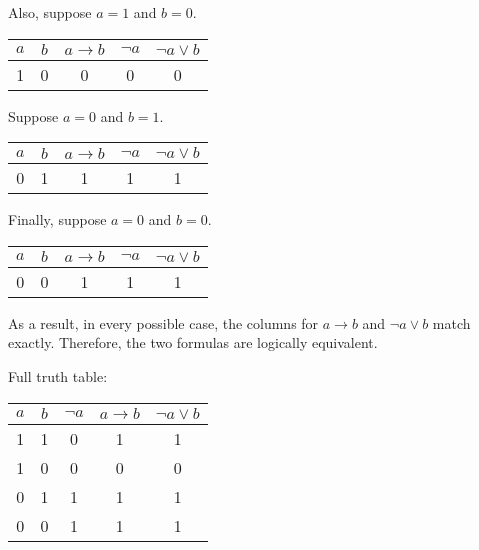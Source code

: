 \documentclass[12pt,a4paper,openany]{article}
\begin{document}
Also, suppose $a = 1$ and $b = 0$.

\begin{center}
\begin{tabular}{|c|c|c|c|c|}
\hline
$a$ & $b$ & $a \rightarrow b$ & $\neg a$ & $\neg a \lor b$ \\
\hline
\textcolor{truecolor}{1} & \textcolor{falsecolor}{0} & \textcolor{falsecolor}{0} & \textcolor{falsecolor}{0} & \textcolor{falsecolor}{0} \\
\hline
\end{tabular}
\end{center}

Suppose $a = 0$ and $b = 1$.

\begin{center}
\begin{tabular}{|c|c|c|c|c|}
\hline
$a$ & $b$ & $a \rightarrow b$ & $\neg a$ & $\neg a \lor b$ \\
\hline
\textcolor{falsecolor}{0} & \textcolor{truecolor}{1} & \textcolor{truecolor}{1} & \textcolor{truecolor}{1} & \textcolor{truecolor}{1} \\
\hline
\end{tabular}
\end{center}

Finally, suppose $a = 0$ and $b = 0$.

\begin{center}
\begin{tabular}{|c|c|c|c|c|}
\hline
$a$ & $b$ & $a \rightarrow b$ & $\neg a$ & $\neg a \lor b$ \\
\hline
\textcolor{falsecolor}{0} & \textcolor{falsecolor}{0} & \textcolor{truecolor}{1} & \textcolor{truecolor}{1} & \textcolor{truecolor}{1} \\
\hline
\end{tabular}
\end{center}

As a result, in every possible case, the columns for $a \rightarrow b$ and $\neg a \lor b$ match exactly. Therefore, the two formulas are logically equivalent.

Full truth table:

\begin{center}
\begin{tabular}{|c|c|c|c|c|}
\hline
$a$ & $b$ & $\neg a$ & $a \rightarrow b$ & $\neg a \lor b$ \\
\hline
\textcolor{truecolor}{1} & \textcolor{truecolor}{1} & \textcolor{falsecolor}{0} & \textcolor{truecolor}{1} & \textcolor{truecolor}{1} \\
\textcolor{truecolor}{1} & \textcolor{falsecolor}{0} & \textcolor{falsecolor}{0} & \textcolor{falsecolor}{0} & \textcolor{falsecolor}{0} \\
\textcolor{falsecolor}{0} & \textcolor{truecolor}{1} & \textcolor{truecolor}{1} & \textcolor{truecolor}{1} & \textcolor{truecolor}{1} \\
\textcolor{falsecolor}{0} & \textcolor{falsecolor}{0} & \textcolor{truecolor}{1} & \textcolor{truecolor}{1} & \textcolor{truecolor}{1} \\
\hline
\end{tabular}
\end{center}
\end{document}
